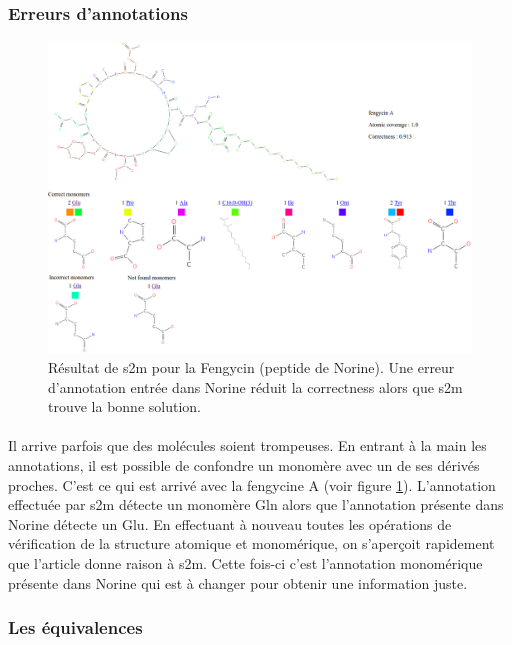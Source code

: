 \documentclass[12pt,french,twoside]{report}
\begin{document}
\subsubsection{Erreurs d'annotations}

\begin{figure}[h!]
  \begin{center}
    \includegraphics[width=450px]{Figures/s2m/results/fengycin.png}
    \caption{\label{fengycin}Résultat de s2m pour la Fengycin (peptide de Norine).
    Une erreur d'annotation entrée dans Norine réduit la correctness alors que s2m trouve la bonne solution.}
  \end{center}
\end{figure}

\paragraph{}Il arrive parfois que des molécules soient trompeuses.
En entrant à la main les annotations, il est possible de confondre un monomère avec un de ses dérivés proches.
C'est ce qui est arrivé avec la fengycine A (voir figure \ref{fengycin}).
L'annotation effectuée par s2m détecte un monomère Gln alors que l'annotation présente dans Norine détecte un Glu.
En effectuant à nouveau toutes les opérations de vérification de la structure atomique et monomérique, on s'aperçoit rapidement que l'article donne raison à s2m.
Cette fois-ci c'est l'annotation monomérique présente dans Norine qui est à changer pour obtenir une information juste.


\subsubsection{Les équivalences}
\end{document}
